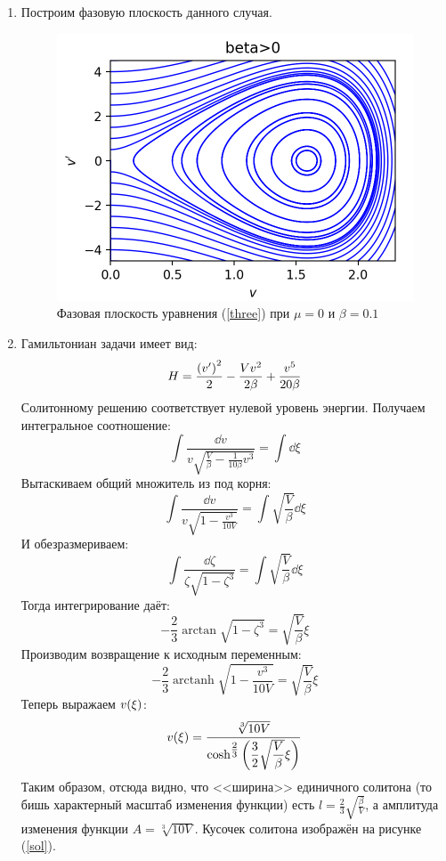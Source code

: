 \documentclass[titlepage]{article}
\DeclareMathOperator\arctanh{arctanh}
\begin{document}
\begin{enumerate}
 \item Построим фазовую плоскость данного случая.
\begin{figure}[h]
 \includegraphics[width = 160 mm]{0-.png}
 \caption{Фазовая плоскость уравнения (\ref{three}) при $\mu=0$ и $\beta=0.1$}
\end{figure}

\item Гамильтониан задачи имеет вид:
\begin{equation}
 H = \frac{\qty(v')^2}{2} - \frac{V v^2}{2\beta} + \frac{v^5}{20\beta} 
\end{equation}
Солитонному решению соответствует нулевой уровень энергии. Получаем интегральное соотношение:
\begin{equation}
 \int \dfrac{\dd{v}}{v\sqrt{\frac{V}{\beta} - \frac{1}{10\beta} v^3}} = \int \dd{\xi}
\end{equation}
Вытаскиваем общий множитель из под корня:
\begin{equation}
 \int \dfrac{\dd{v}}{v\sqrt{1 - \frac{v^3}{10V}}} = \int \sqrt{\frac{V}{\beta}} \dd{\xi}
\end{equation}
И обезразмериваем:
\begin{equation}
 \int  \dfrac{\dd{\zeta}}{\zeta\sqrt{1 - \zeta^3}} = \int \sqrt{\frac{V}{\beta}} \dd{\xi}
\end{equation}
Тогда интегрирование даёт:
\begin{equation}
 -\dfrac23 \arctan{\sqrt{1-\zeta^3}} = \sqrt{\frac{V}{\beta}} \xi
\end{equation}
Производим возвращение к исходным переменным:
\begin{equation}
 -\dfrac23 \arctanh{\sqrt{1-\frac{v^3}{10V}}} = \sqrt{\frac{V}{\beta}} \xi
\end{equation}
Теперь выражаем $v\qty(\xi)$:
\begin{equation}\label{soliton}
 v\qty(\xi) = \dfrac{\sqrt[3]{10V}}{\cosh^{\tfrac23}{\qty(\dfrac32\sqrt{\dfrac{V}{\beta}}\xi)}}
\end{equation}
Таким образом, отсюда видно, что <<ширина>> единичного солитона (то бишь характерный масштаб изменения функции) есть ${ l = \tfrac{2}{3}\sqrt{\tfrac{\beta}{V}}}$, а амплитуда изменения функции ${ A = \sqrt[3]{10V}}$. Кусочек солитона изображён на рисунке (\ref{sol}).
\end{enumerate}
\end{document}
